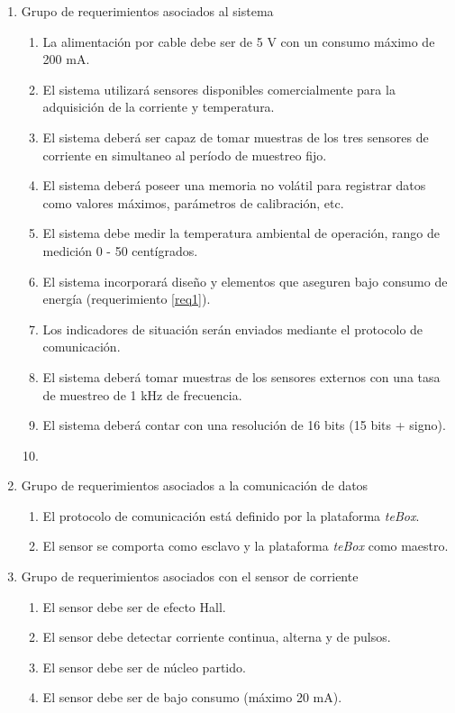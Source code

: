 \documentclass[11pt]{charter}
\begin{document}
\begin{enumerate}
\item Grupo de requerimientos asociados al sistema
	\begin{enumerate}
	\item La alimentación por cable debe ser de 5 V con un consumo máximo de 200 mA. \label{req1}
	\item El sistema utilizará sensores disponibles comercialmente para la adquisición de la corriente y temperatura.
	\item El sistema deberá ser capaz de tomar muestras de los tres sensores de corriente en simultaneo al período de muestreo fijo.
	\item El sistema deberá poseer una memoria no volátil para registrar datos como valores máximos, parámetros de calibración, etc. 
	\item El sistema debe medir la temperatura ambiental de operación, rango de medición 0 - 50 centígrados.
	\item El sistema incorporará diseño y elementos que aseguren bajo consumo de energía (requerimiento \ref{req1}).
	\item Los indicadores de situación serán enviados mediante el protocolo de comunicación.
	\item El sistema deberá tomar muestras de los sensores externos con una tasa de muestreo de 1 kHz de frecuencia.
	\item El sistema deberá contar con una resolución de 16 bits (15 bits + signo).
	\item  
	\end{enumerate}
\item Grupo de requerimientos asociados a la comunicación de datos
	\begin{enumerate}
	\item El protocolo de comunicación está definido por la plataforma \textit{teBox}.
	\item El sensor se comporta como esclavo y la plataforma \textit{teBox} como maestro.
	\end{enumerate}
\item Grupo de requerimientos asociados con el sensor de corriente
	\begin{enumerate}
	\item El sensor debe ser de efecto Hall.
	\item El sensor debe detectar corriente continua, alterna y de pulsos.
	\item El sensor debe ser de núcleo partido.
	\item El sensor debe ser de bajo consumo (máximo 20 mA).

\end{enumerate}
\end{enumerate}
\end{document}
